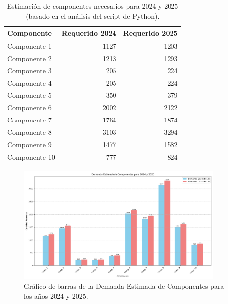 \documentclass[12pt,a4paper]{article}
\begin{document}
\begin{table}[H]
\centering
\caption{Estimación de componentes necesarios para 2024 y 2025 (basado en el análisis del script de Python).}
\label{tab:componentes_requeridos_2024_2025}
\begin{tabular}{@{}lrr@{}}
\toprule
Componente   & Requerido 2024 & Requerido 2025 \\ \midrule
Componente 1 & 1127           & 1203           \\
Componente 2 & 1213           & 1293           \\
Componente 3 & 205            & 224            \\
Componente 4 & 205            & 224            \\
Componente 5 & 350            & 379            \\
Componente 6 & 2002           & 2122           \\
Componente 7 & 1764           & 1874           \\
Componente 8 & 3103           & 3294           \\
Componente 9 & 1477           & 1582           \\
Componente 10& 777            & 824            \\ \bottomrule
\end{tabular}
\end{table}

\begin{figure}[H]
\centering
\includegraphics[width=0.9\textwidth]{Demanda estimada de componentes para 2024 y 2025.png}
\caption{Gráfico de barras de la Demanda Estimada de Componentes para los años 2024 y 2025.}
\label{fig:demanda_componentes_2024_2025_img}
\end{figure}
\end{document}
